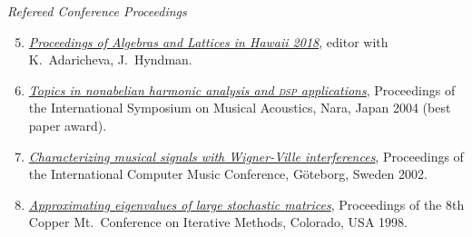     {\it Refereed Conference Proceedings}
    \begin{enumerate}
      \setcounter{enumi}{4}

     \item \href{http://www.lulu.com/shop/kira-adaricheva-and-william-demeo-and-jennifer-hyndman/algebras-and-lattices-in-hawaii-honoring-ralph-freese-bill-lampe-and-jb-nation/paperback/product-23634583.html}{\it Proceedings of Algebras and Lattices in Hawaii 2018}, editor with K.~Adaricheva, J.~Hyndman.

    \item \href{https://github.com/williamdemeo/ISMA2004/raw/master/DeMeo-ISMA2004-FinalPaper.pdf}%
           {{\it Topics in nonabelian harmonic analysis and \textsc{dsp}  applications}},
      Proceedings of the International Symposium on Musical Acoustics, Nara, Japan 2004
      (best paper award).

    \item \href{https://github.com/williamdemeo/ICMC2002/raw/master/DeMeo-ICMC2002.pdf}%
           {\it Characterizing musical signals with Wigner-Ville interferences},
      Proceedings of the International Computer Music Conference, G\"{o}teborg, Sweden 2002.

     \item \href{https://williamdemeo.github.io/MSThesis}%
           {{\it Approximating eigenvalues of large stochastic matrices}},
      Proceedings of the 8th Copper Mt.~Conference on Iterative Methods,
      Colorado, USA 1998.
    \end{enumerate}

\newpage

~\vspace{-15mm}


